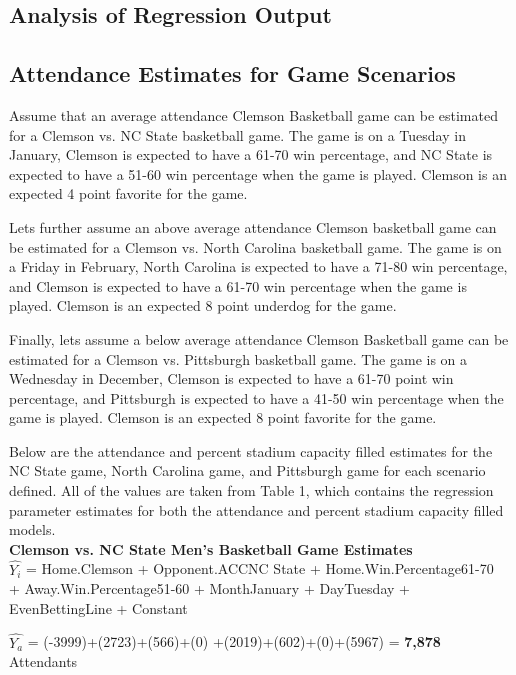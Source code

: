 \documentclass[preprint,12pt,times]{elsarticle}
\begin{document}
\begin{large}
\section{\textbf{Analysis of Regression Output}}
\end{large}
\subsection{\textbf{Attendance Estimates for Game Scenarios}}
Assume that an average attendance Clemson Basketball game can be estimated for a Clemson vs. NC State basketball game.  The game is on a Tuesday in January, Clemson is expected to have a 61-70 win percentage, and NC State is expected to have a 51-60 win percentage when the game is played.  Clemson is an expected 4 point favorite for the game.

Lets further assume an above average attendance Clemson basketball game can be estimated for a Clemson vs. North Carolina basketball game.  The game is on a Friday in February, North Carolina is expected to have a 71-80 win percentage, and Clemson is expected to have a 61-70 win percentage when the game is played.  Clemson is an expected 8 point underdog for the game.

Finally, lets assume a below average attendance Clemson Basketball game can be estimated for a Clemson vs. Pittsburgh basketball game.  The game is on a Wednesday in December, Clemson is expected to have a 61-70 point win percentage, and Pittsburgh is expected to have a 41-50 win percentage when the game is played.  Clemson is an expected 8 point favorite for the game.

Below are the attendance and percent stadium capacity filled estimates for the NC State game, North Carolina game, and Pittsburgh game for each scenario defined.  All of the values are taken from Table 1, which contains the regression parameter estimates for both the attendance and percent stadium capacity filled models.\\

\noindent\textbf{Clemson vs. NC State Men's Basketball Game Estimates}\\
\noindent
$\hat{Y_i}$ = Home.Clemson + Opponent.ACCNC State + Home.Win.Percentage61-70\\ + Away.Win.Percentage51-60 + MonthJanuary + DayTuesday + EvenBettingLine + Constant

\noindent$\hat{Y_a}$ = (-3999)+(2723)+(566)+(0)
+(2019)+(602)+(0)+(5967) = \textbf{7,878} Attendants
\end{document}
